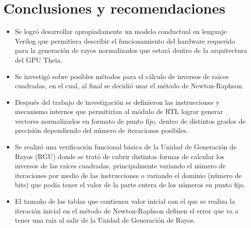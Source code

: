 \chapter{Conclusiones y recomendaciones}

\begin{itemize}

\item Se logró desarrollar apropiadamente un modelo conductual en lenguaje Verilog que permitiera describir el funcionamiento del hardware requerido para la generación de rayos normalizados que estará dentro de la arquitectura del GPU Theia.

\item Se investigó sobre posibles métodos para el cálculo de inversos de raíces cuadradas, en el cual, al final se decidió usar el método de Newton-Raphson.

\item Después del trabajo de investigación se definieron las instrucciones y mecanismo internos que permitirían al módulo de RTL lograr generar vectores normalizados en formato de punto fijo, dentro de distintos grados de precisión dependiendo del número de iteraciones posibiles.

\item Se realizó una verificación funcional básica de la Unidad de Generación de Rayos (RGU) donde se trató de cubrir distintas formas de calcular los inversos de las raíces cuadradas, principalmente variando el número de iteraciones por medio de las instrucciones o variando el dominio (número de bits) que podía tener el valor de la parte entera de los números en punto fijo.

\item El tamaño de las tablas que contienen valor inicial con el que se realiza la iteración inicial en el método de Newton-Raphson definen el error que va a tener una raíz al salir de la Unidad de Generación de Rayos.  

\end{itemize}

